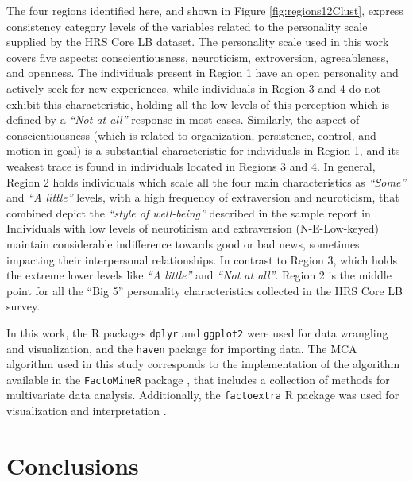 \documentclass[conference,final,]{IEEEtran}
\begin{document}
The four regions identified here, and shown in Figure
\ref{fig:regions12Clust}, express consistency category levels of the
variables related to the personality scale \cite{lachman1997midlife}
supplied by the HRS Core LB dataset. The personality scale used in this
work covers five aspects: conscientiousness, neuroticism, extroversion,
agreeableness, and openness. The individuals present in Region 1 have an
open personality and actively seek for new experiences, while
individuals in Region 3 and 4 do not exhibit this characteristic,
holding all the low levels of this perception which is defined by a
\emph{``Not at all''} response in most cases. Similarly, the aspect of
conscientiousness (which is related to organization, persistence,
control, and motion in goal) is a substantial characteristic for
individuals in Region 1, and its weakest trace is found in individuals
located in Regions 3 and 4. In general, Region 2 holds individuals which
scale all the four main characteristics as \emph{``Some''} and \emph{``A
little''} levels, with a high frequency of extraversion and neuroticism,
that combined depict the \emph{``style of well-being''} described in the
sample report in \cite{costa_nodate}. Individuals with low levels of
neuroticism and extraversion (N-E-Low-keyed) maintain considerable
indifference towards good or bad news, sometimes impacting their
interpersonal relationships. In contrast to Region 3, which holds the
extreme lower levels like \emph{``A little''} and \emph{``Not at all''}.
Region 2 is the middle point for all the ``Big 5'' personality
characteristics collected in the HRS Core LB survey.

In this work, the R packages \texttt{dplyr} \cite{Refdplyr} and
\texttt{ggplot2} \cite{ggplotBook} were used for data wrangling and
visualization, and the \texttt{haven} package \cite{wickham2018haven}
for importing data. The MCA algorithm used in this study corresponds to
the implementation of the algorithm available in the \texttt{FactoMineR}
package \cite{le2008factominer}, that includes a collection of methods
for multivariate data analysis. Additionally, the \texttt{factoextra} R
package was used for visualization and interpretation \cite{factoextra}.

\hypertarget{conclusions}{%
\section{Conclusions}\label{conclusions}}
\end{document}
